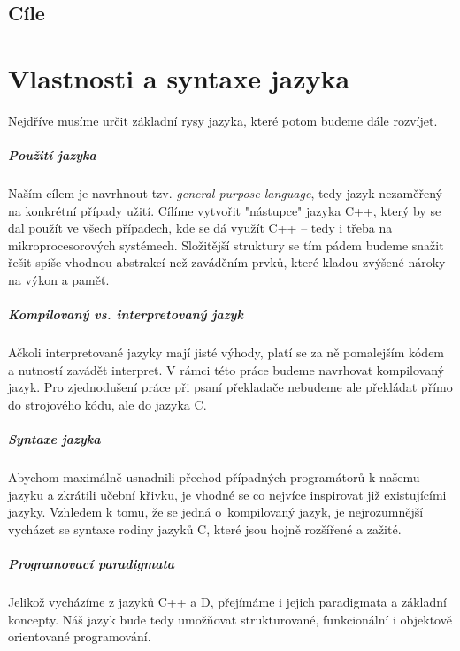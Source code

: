 \section{Cíle}

\chapter{Vlastnosti a syntaxe jazyka}
Nejdříve musíme určit základní rysy jazyka, které potom budeme dále rozvíjet.

\paragraph{Použití jazyka}
Naším cílem je navrhnout tzv. \textit{general purpose language}, tedy jazyk nezaměřený na konkrétní případy užití. Cílíme vytvořit "nástupce" jazyka C++, který by se dal použít ve všech případech, kde se dá využít C++ -- tedy i třeba na mikroprocesorových systémech. Složitější struktury se tím pádem budeme snažit řešit spíše vhodnou abstrakcí než zaváděním prvků, které kladou zvýšené nároky na výkon a paměť.

\paragraph{Kompilovaný vs. interpretovaný jazyk}
Ačkoli interpretované jazyky mají jisté výhody, platí se za ně pomalejším kódem a nutností zavádět interpret. V rámci této práce budeme navrhovat kompilovaný jazyk. Pro zjednodušení práce při psaní překladače nebudeme ale překládat přímo do strojového kódu, ale do jazyka C.

\paragraph{Syntaxe jazyka}
Abychom maximálně usnadnili přechod případných programátorů k našemu jazyku a zkrátili učební křivku, je vhodné se co nejvíce inspirovat již existujícími jazyky. Vzhledem k tomu, že se jedná o~kompilovaný jazyk, je nejrozumnější vycházet se syntaxe rodiny jazyků C, které jsou hojně rozšířené a zažité.

\paragraph{Programovací paradigmata}
Jelikož vycházíme z jazyků C++ a D, přejímáme i jejich paradigmata a základní koncepty. Náš jazyk bude tedy umožňovat strukturované, funkcionální i objektově orientované programování.

